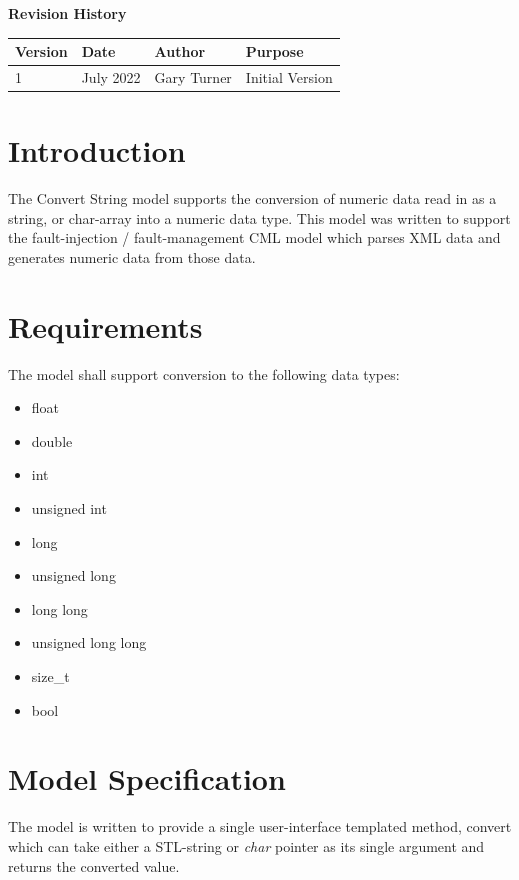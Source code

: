 \documentclass[11pt,fleqn]{report}
\begin{document}
\titlePage
\clearpage %
\tableofcontents %
\vfill
{\Large \textbf {Revision History}}
{\large
\begin{center}
\begin{tabular}{|l||l|l|l|}
\hline
 \textbf{Version} & \textbf{Date} & \textbf{Author} & \textbf{Purpose} \\ \hline
 \hline
1 & July 2022 & Gary Turner & Initial Version \\ \hline
\end{tabular}
\end{center}
}

\chapter{Introduction} %
The Convert String model supports the conversion of numeric data read in
as a string, or char-array into a numeric data type. This model was written
to support the fault-injection / fault-management CML model which parses
XML data and generates numeric data from those data.


\chapter {Requirements}
The model shall support conversion to the following data types:
\begin{itemize}
  \item float
  \item double
  \item int
  \item unsigned int
  \item long
  \item unsigned long
  \item long long
  \item unsigned long long
  \item size\_t
  \item bool
\end{itemize}


\chapter {Model Specification}
The model is written to provide a single user-interface templated method,
convert which can take either a STL-string or \textit{char} pointer as its
single argument and returns the converted value.
\end{document}
